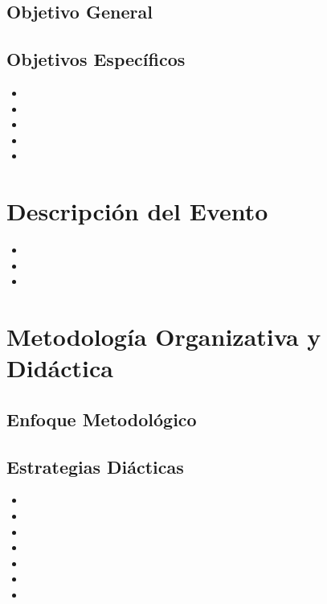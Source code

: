 \documentclass[letterpaper, 12pt, titlepage]{article} %
\begin{document}
	\subsection{Objetivo General}

	\lipsum[1][1-4]

	\subsection{Objetivos Específicos}
	
	\begin{itemize}
		\item \lipsum[1][1-3]
		\item \lipsum[1][1-3]
		\item \lipsum[1][1-3]
		\item \lipsum[1][1-3]
		\item \lipsum[1][1-3]
	\end{itemize}

	\section{Descripción del Evento}

	\lipsum[1][1-6]

	\begin{itemize}
		\item \lipsum[1][1-4]
		\item \lipsum[1][1-4]
		\item \lipsum[1][1-4]
	\end{itemize}

	\lipsum[2][1-6]

	\section{Metodología Organizativa y Didáctica}

	\subsection{Enfoque Metodológico}

	\lipsum[1][1-6]

	\subsection{Estrategias Diácticas}

	\begin{itemize}
		\item \lipsum[1][1]
		\item \lipsum[1][1]
		\item \lipsum[1][1]
		\item \lipsum[1][1]
		\item \lipsum[1][1]
		\item \lipsum[1][1]
		\item \lipsum[1][1]
	\end{itemize}
\end{document}
